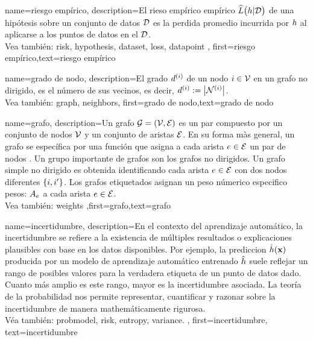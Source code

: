 {name={riesgo empírico},
 description={El rieso empírico empírico $\widehat{L}\big(h|\mathcal{D}\big)$ 
 	de una hipótesis sobre un conjunto de datos $\mathcal{D}$ es la perdida promedio incurrida 
 	por $h$ al aplicarse a los puntos de datos en el $\mathcal{D}$.
	 \\
	 Vea también: \gls{risk}, \gls{hypothesis}, \gls{dataset}, \gls{loss}, \gls{datapoint} },
 first={riesgo empírico},text={riesgo empírico} 
}

{name={grado de nodo},
	description={El grado $d^{(i)}$ de un nodo $i \in \mathcal{V}$ 
		en un grafo no dirigido, es el número de sus vecinos, es decir, $d^{(i)} := \big|\mathcal{N}^{(i)}\big|$.
		\\
	 Vea también: \gls{graph}, \gls{neighbors}},
		first={grado de nodo},text={grado de nodo} 
}


{name={grafo},
	description={Un grafo $\mathcal{G} = \left( \mathcal{V},\mathcal{E} \right)$ es un par compuesto por un  
		conjunto de nodos $\mathcal{V}$ y un conjunto de aristas $\mathcal{E}$. En su forma màs general, un grafo se 
		específica por una función que asigna a cada arista $e \in \mathcal{E}$ un par de nodos \cite{RockNetworks}. 
		Un grupo importante de grafos son los grafos no dirigidos. Un grafo simple no dirigido  
		es obtenida identificando cada arista $e \in \mathcal{E}$ con dos nodos diferentes $\{i,i'\}$. 
		Los grafos etiquetados asignan un peso númerico especifico pesos: $A_{e}$ a cada 
		arista $e \in \mathcal{E}$.
		\\
	 Vea también: \gls{weights} },first={grafo},text={grafo} 
}

{name={incertidumbre},
	description={En el contexto del aprendizaje automático, la incertidumbre se refiere a la existencia de múltiples 
	resultados o explicaciones plausibles con base en los datos disponibles. Por ejemplo, la 
	prediccion $\hat{h}({\bf x})$ producida por un modelo de aprendizaje automático entrenado $\hat{h}$
	suele reflejar un rango de posibles valores para la verdadera etiqueta de un punto de datos dado. 
	Cuanto más amplio es este rango, mayor es la incertidumbre asociada. La teoría de la probabilidad
	nos permite representar, cuantificar y razonar sobre la incertidumbre de manera 
	mathemáticamente rigurosa.
	\\ 
	Véa también: \gls{probmodel}, \gls{risk}, \gls{entropy}, \gls{variance}. },
	first={incertidumbre},
	text={incertidumbre}
}


